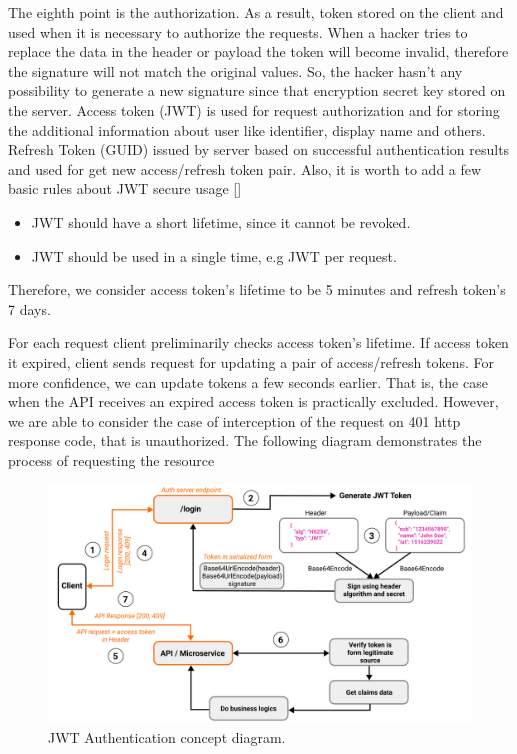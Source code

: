 The eighth point is the authorization.
As a result, token stored on the client and used when it is necessary to authorize the requests.
When a hacker tries to replace the data in the header or payload the token will become invalid,
therefore the signature will not match the original values.
So, the hacker hasn't any possibility to generate a new signature since that encryption secret key stored on the server.
Access token (JWT) is used for request authorization and for storing the additional information about user like identifier,
display name and others.
Refresh Token (GUID) issued by server based on successful authentication results and used for get new access/refresh
token pair.
Also, it is worth to add a few basic rules about JWT secure usage [\cite{RDegges}]
\begin{itemize}
    \item JWT should have a short lifetime, since it cannot be revoked.
    \item JWT should be used in a single time, e.g JWT per request.
\end{itemize}
Therefore, we consider access token's lifetime to be 5 minutes and refresh token's 7 days.

For each request client preliminarily checks access token's lifetime.
If access token it expired, client sends request for updating a pair of access/refresh tokens.
For more confidence, we can update tokens a few seconds earlier.
That is, the case when the API receives an expired access token is practically excluded.
However, we are able to consider the case of interception of the request on 401 http response code,
that is unauthorized.
The following diagram demonstrates the process of requesting the resource

\begin{figure}[H]
    \centering
    \includegraphics[width=1\textwidth]{Pictures/jwt_auth_scheme.pdf}
    \caption{JWT Authentication concept diagram.}\label{fig:figure3}
\end{figure}

